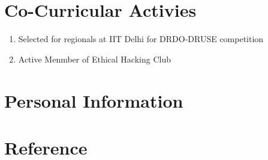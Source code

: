 \documentclass[11pt,a4paper,sans]{moderncv} %
\begin{document}
\section{Co-Curricular Activies}
		\begin{enumerate}
			\item Selected for regionals at IIT Delhi for DRDO-DRUSE competition
			\newline{}
			\item Active Menmber of Ethical Hacking Club
			\newline{} 
			
		\end{enumerate}	
\section{Personal Information}
		
\section{Reference}
		
\end{document}
